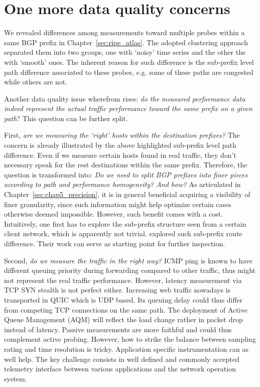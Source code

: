 \section{One more data quality concerns}
We revealed differences among measurements toward multiple probes within a same BGP prefix in Chapter~\ref{sec:ripe_atlas}. The adopted clustering approach separated them into two groups, one with `noisy' time series and the other the with `smooth' ones. The inherent reason for such difference is the sub-prefix level path difference associated to these probes, e.g. some of these paths are congested while others are not.

Another data quality issue wherefrom rises: \textit{do the measured performance data indeed represent the actual traffic performance toward the same prefix on a given path}?
This question can be further split. 

First, \textit{are we measuring the `right' hosts within the destination prefixes?} The concern is already illustrated by the above highlighted sub-prefix level path difference. Even if we measure certain hosts found in real traffic, they don't necessary speak for the rest destinations within the same prefix.
Therefore, the question is transformed into: \textit{Do we need to split BGP prefixes into finer pieces according to path and performance homogeneity? And how?}
As articulated in Chapter~\ref{sec:chap5_precision}, it is in general beneficial acquiring a visibility of finer granularity, since such information might help optimize certain cases otherwise deemed impossible.
However, such benefit comes with a cost. Intuitively, one first has to explore the sub-prefix structure seen from a certain client network, which is apparently not trivial.
\citet{Lee2016} explored such sub-prefix route difference. Their work can serve as starting point for further inspection.

Second, \textit{do we measure the traffic in the right way?} ICMP ping is known to have different queuing priority during forwarding compared to other traffic, thus might not represent the real traffic performance. However, latency measurement via TCP SYN stealth is not perfect either. Increasing web traffic nowadays is transported in QUIC which is UDP based. Its queuing delay could thus differ from competing TCP connections on the same path.
The deployment of Active Queue Management (AQM) will reflect the load change rather in packet drop instead of latency.
Passive measurements are more faithful and could thus complement active probing. However, how to strike the balance between sampling rating and time resolution is tricky.
Application specific instrumentation can as well help. The key challenge consists in well defined and commonly accepted telemetry interface between various applications and the network operation system.


